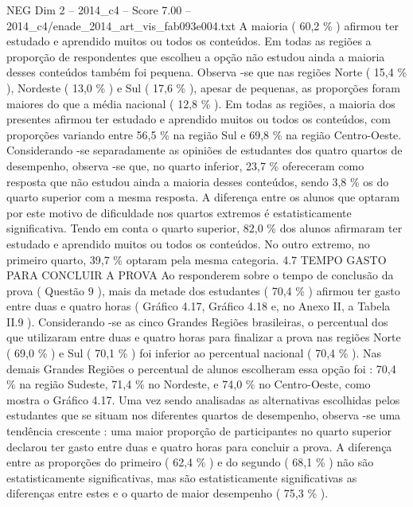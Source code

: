 \begin{textsample}{NEG Dim 2 – 2014\_c4 – Score 7.00 – 2014\_c4/enade\_2014\_art\_vis\_fab093e004.txt}
A maioria ( 60,2 \% ) afirmou ter estudado e aprendido muitos ou todos os conteúdos.
Em todas as regiões a proporção de respondentes que escolheu a opção não estudou ainda a maioria desses conteúdos também foi pequena.
Observa -se que nas regiões Norte ( 15,4 \% ), Nordeste ( 13,0 \% ) e Sul ( 17,6 \% ), apesar de pequenas, as proporções foram maiores do que a média nacional ( 12,8 \% ).
Em todas as regiões, a maioria dos presentes afirmou ter estudado e aprendido muitos ou todos os conteúdos, com proporções variando entre 56,5 \% na região Sul e 69,8 \% na região Centro-Oeste.
Considerando -se separadamente as opiniões de estudantes dos quatro quartos de desempenho, observa -se que, no quarto inferior, 23,7 \% ofereceram como resposta que não estudou ainda a maioria desses conteúdos, sendo 3,8 \% os do quarto superior com a mesma resposta.
A diferença entre os alunos que optaram por este motivo de dificuldade nos quartos extremos é estatisticamente significativa.
Tendo em conta o quarto superior, 82,0 \% dos alunos afirmaram ter estudado e aprendido muitos ou todos os conteúdos.
No outro extremo, no primeiro quarto, 39,7 \% optaram pela mesma categoria. 4.7 TEMPO GASTO PARA CONCLUIR A PROVA Ao responderem sobre o tempo de conclusão da prova ( Questão 9 ), mais da metade dos estudantes ( 70,4 \% ) afirmou ter gasto entre duas e quatro horas ( Gráfico 4.17, Gráfico 4.18 e, no Anexo II, a Tabela II.9 ).
Considerando -se as cinco Grandes Regiões brasileiras, o percentual dos que utilizaram entre duas e quatro horas para finalizar a prova nas regiões Norte ( 69,0 \% ) e Sul ( 70,1 \% ) foi inferior ao percentual nacional ( 70,4 \% ).
Nas demais Grandes Regiões o percentual de alunos escolheram essa opção foi : 70,4 \% na região Sudeste, 71,4 \% no Nordeste, e 74,0 \% no Centro-Oeste, como mostra o Gráfico 4.17.
Uma vez sendo analisadas as alternativas escolhidas pelos estudantes que se situam nos diferentes quartos de desempenho, observa -se uma tendência crescente : uma maior proporção de participantes no quarto superior declarou ter gasto entre duas e quatro horas para concluir a prova.
A diferença entre as proporções do primeiro ( 62,4 \% ) e do segundo ( 68,1 \% ) não são estatisticamente significativas, mas são estatisticamente significativas as diferenças entre estes e o quarto de maior desempenho ( 75,3 \% ).

\end{textsample}
